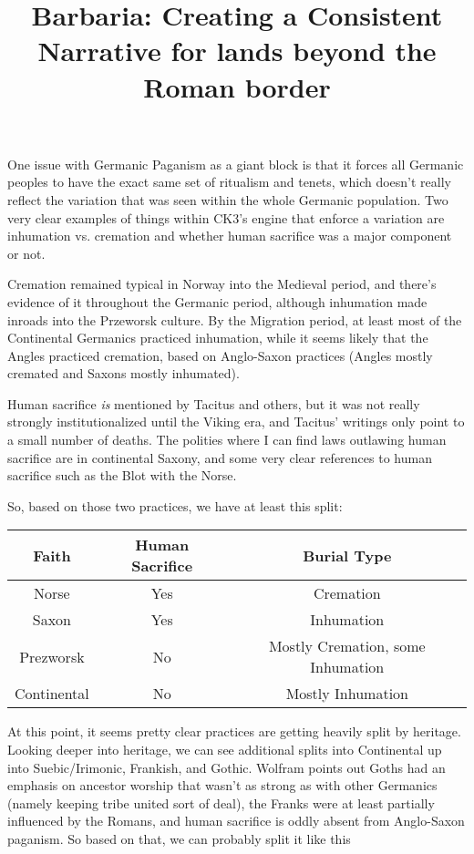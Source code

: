 \documentclass{article}
\title{Barbaria: Creating a Consistent Narrative for lands beyond the Roman border}
\begin{document}

	\maketitle
	
	One issue with Germanic Paganism as a giant block is that it forces all Germanic peoples to have the exact same set of ritualism and tenets, which doesn't really reflect the variation that was seen within the whole Germanic population.
	Two very clear examples of things within CK3's engine that enforce a variation are inhumation vs. cremation and whether human sacrifice was a major component or not.
	
	Cremation remained typical in Norway into the Medieval period, and there's evidence of it throughout the Germanic period, although inhumation made inroads into the Przeworsk culture.
	By the Migration period, at least most of the Continental Germanics practiced inhumation, while it seems likely that the Angles practiced cremation, based on Anglo-Saxon practices (Angles mostly cremated and Saxons mostly inhumated).
	
	Human sacrifice \textit{is} mentioned by Tacitus and others, but it was not really strongly institutionalized until the Viking era, and Tacitus' writings only point to a small number of deaths.
	The polities where I can find laws outlawing human sacrifice are in continental Saxony, and some very clear references to human sacrifice such as the Blot with the Norse.
	
	So, based on those two practices, we have at least this split:
	
	\begin{tabular}{|c|c|c|}
		\hline
		Faith & Human Sacrifice & Burial Type\\
		\hline
		Norse & Yes & Cremation\\
		Saxon & Yes & Inhumation\\
		Prezworsk & No & Mostly Cremation, some Inhumation\\
		Continental & No & Mostly Inhumation\\
		\hline
	\end{tabular}
	
	At this point, it seems pretty clear practices are getting heavily split by heritage.
	Looking deeper into heritage, we can see additional splits into Continental up into Suebic/Irimonic, Frankish, and Gothic.
	Wolfram points out Goths had an emphasis on ancestor worship that wasn't as strong as with other Germanics (namely keeping tribe united sort of deal), the Franks were at least partially influenced by the Romans, and human sacrifice is oddly absent from Anglo-Saxon paganism. So based on that, we can probably split it like this
	
\end{document}
